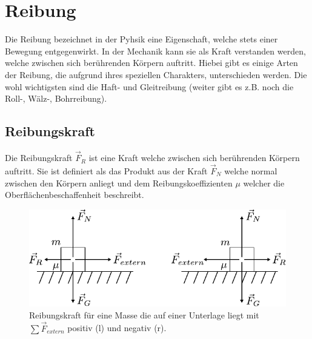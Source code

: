 



\chapter{Reibung}

Die Reibung bezeichnet in der Pyhsik eine Eigenschaft, welche stets einer
Bewegung entgegenwirkt. In der Mechanik kann sie als Kraft verstanden
werden, welche zwischen sich berührenden Körpern auftritt. Hiebei gibt es
einige Arten der Reibung, die aufgrund ihres speziellen Charakters, 
unterschieden werden. Die wohl wichtigsten sind die Haft- und 
Gleitreibung (weiter gibt es z.B. noch die Roll-, Wälz-, Bohrreibung).

\newpage
\section{Reibungskraft}
Die Reibungskraft $\vec{F}_R$ ist eine Kraft welche zwischen sich
berührenden Körpern auftritt. Sie ist definiert als das Produkt aus
der Kraft $\vec{F}_N$ welche normal zwischen den Körpern anliegt
und dem Reibungskoeffizienten $\mu$ welcher die 
Oberflächenbeschaffenheit beschreibt. 

\begin{figure}[h!]
	\centering
	\includegraphics[scale=0.8]{reibung.pdf}
	\caption{Reibungskraft für eine Masse die auf einer Unterlage 
		liegt mit $\sum \vec{F}_{extern}$ positiv (l)
		und negativ (r).}
\end{figure}

